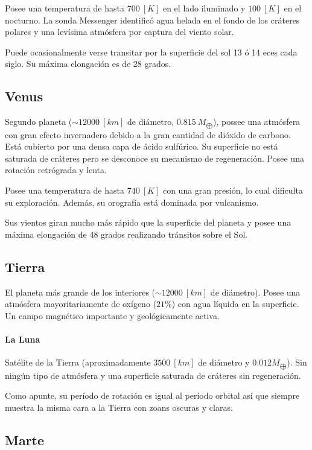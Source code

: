 \documentclass{tufte-handout}
\begin{document}
Posee una temperatura de hasta $700~[K]$ en el lado iluminado y $100~[K]$ en el nocturno. La sonda Messenger identificó agua helada en el fondo de los cráteres polares y una levísima atmósfera por captura del viento solar.

Puede ocasionalmente verse transitar por la superficie del sol 13 ó 14 eces cada siglo. Su máxima elongación es de 28 grados.

\subsection{Venus}

Segundo planeta ($\sim 12000~[km]$ de diámetro, $0.815~M_{\bigoplus}$), possee una atmósfera con gran efecto invernadero debido a la gran cantidad de dióxido de carbono. Está cubierto por una densa capa de ácido sulfúrico. Su superficie no está saturada de cráteres pero se desconoce su mecanismo de regeneración. Posee una rotación retrógrada y lenta.

Posee una temperatura de hasta $740~[K]$ con una gran presión, lo cual dificulta su exploración. Además, su orografía está dominada por vulcanismo.

Sus vientos giran mucho más rápido que la superficie del planeta y posee una máxima elongación de 48 grados realizando tránsitos sobre el Sol.

\subsection{Tierra}

El planeta más grande de los interiores ($\sim 12000~[km]$ de diámetro). Posee una atmósfera mayoritariamente de oxígeno ($21\%$) con agua líquida en la superficie. Un campo magnético importante y geológicamente activa.

\paragraph{La Luna}

Satélite de la Tierra (aproximadamente $3500~[km]$ de diámetro y $0.012 M_{\bigoplus}$). Sin ningún tipo de atmósfera y una superficie saturada de cráteres sin regeneración.

Como apunte, su período de rotación es igual al período orbital así que siempre muestra la misma cara a la Tierra con zoans oscuras y claras.

\subsection{Marte}
\end{document}
